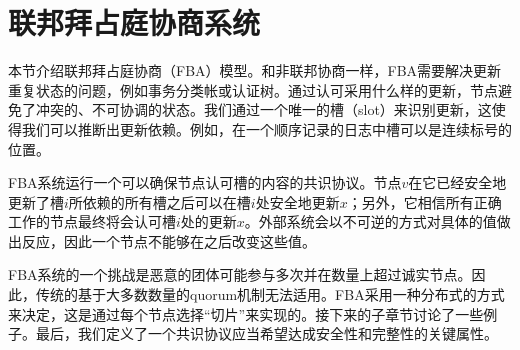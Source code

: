 \section{联邦拜占庭协商系统}\label{sec:fba}

本节介绍联邦拜占庭协商（FBA）模型。和非联邦协商一样，FBA需要解决更新重复状态的问题，例如事务分类帐或认证树。通过认可采用什么样的更新，节点避免了冲突的、不可协调的状态。我们通过一个唯一的槽（slot）来识别更新，这使得我们可以推断出更新依赖。例如，在一个顺序记录的日志中槽可以是连续标号的位置。

FBA系统运行一个可以确保节点认可槽的内容的共识协议。节点$v$在它已经安全地更新了槽$i$所依赖的所有槽之后可以在槽$i$处安全地更新$x$；另外，它相信所有正确工作的节点最终将会认可槽$i$处的更新$x$。外部系统会以不可逆的方式对具体的值做出反应，因此一个节点不能够在之后改变这些值。

FBA系统的一个挑战是恶意的团体可能参与多次并在数量上超过诚实节点。因此，传统的基于大多数数量的quorum机制无法适用。FBA采用一种分布式的方式来决定{\quorum}，这是通过每个节点选择``{\quorum}切片''来实现的。接下来的子章节讨论了一些例子。最后，我们定义了一个共识协议应当希望达成安全性和完整性的关键属性。



